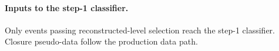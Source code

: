 \paragraph{Inputs to the step-1 classifier.} Only events passing reconstructed-level selection reach the step-1 classifier. Closure pseudo-data follow the production data path.

